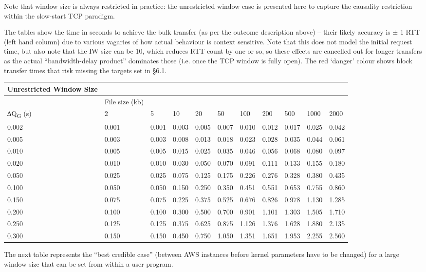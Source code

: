 \documentclass[]{article}
\begin{document}
Note that window size is always restricted in practice: the unrestricted
window case is presented here to capture the causality restriction
within the slow-start TCP paradigm.

The tables show the time in seconds to achieve the bulk transfer (as per
the outcome description above) -- their likely accuracy is ± 1 RTT (left
hand column) due to various vagaries of how actual behaviour is context
sensitive. Note that this does not model the initial request time, but
also note that the IW size can be 10, which reduces RTT count by one or
so, so these effects are cancelled out for longer transfers as the
actual ``bandwidth-delay product'' dominates those (i.e. once the TCP
window is fully open). The red `danger' colour shows block transfer
times that risk missing the targets set in §6.1.

\begin{longtable}[]{@{}lllllllllll@{}}
\toprule
Unrestricted Window Size & & & & & & & & & &\tabularnewline
\midrule
\endhead
& File size (kb) & & & & & & & & &\tabularnewline
∆Q\textbar{}\textsubscript{G} (s) & 2 & 5 & 10 & 20 & 50 & 100 & 200 &
500 & 1000 & 2000\tabularnewline
0.002 & 0.001 & 0.001 & 0.003 & 0.005 & 0.007 & 0.010 & 0.012 & 0.017 &
0.025 & 0.042\tabularnewline
0.005 & 0.003 & 0.003 & 0.008 & 0.013 & 0.018 & 0.023 & 0.028 & 0.035 &
0.044 & 0.061\tabularnewline
0.010 & 0.005 & 0.005 & 0.015 & 0.025 & 0.035 & 0.046 & 0.056 & 0.068 &
0.080 & 0.097\tabularnewline
0.020 & 0.010 & 0.010 & 0.030 & 0.050 & 0.070 & 0.091 & 0.111 & 0.133 &
0.155 & 0.180\tabularnewline
0.050 & 0.025 & 0.025 & 0.075 & 0.125 & 0.175 & 0.226 & 0.276 & 0.328 &
0.380 & 0.435\tabularnewline
0.100 & 0.050 & 0.050 & 0.150 & 0.250 & 0.350 & 0.451 & 0.551 & 0.653 &
0.755 & 0.860\tabularnewline
0.150 & 0.075 & 0.075 & 0.225 & 0.375 & 0.525 & 0.676 & 0.826 & 0.978 &
1.130 & 1.285\tabularnewline
0.200 & 0.100 & 0.100 & 0.300 & 0.500 & 0.700 & 0.901 & 1.101 & 1.303 &
1.505 & 1.710\tabularnewline
0.250 & 0.125 & 0.125 & 0.375 & 0.625 & 0.875 & 1.126 & 1.376 & 1.628 &
1.880 & 2.135\tabularnewline
0.300 & 0.150 & 0.150 & 0.450 & 0.750 & 1.050 & 1.351 & 1.651 & 1.953 &
2.255 & 2.560\tabularnewline
\bottomrule
\end{longtable}

The next table represents the ``best credible case'' (between AWS
instances before kernel parameters have to be changed) for a large
window size that can be set from within a user program.
\end{document}
